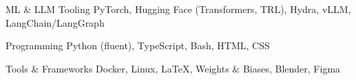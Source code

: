 


\begin{cvskills}

  \cvskill
    {ML \& LLM Tooling}
    {PyTorch, Hugging Face (Transformers, TRL), Hydra, vLLM, LangChain/LangGraph}

  \cvskill
    {Programming}
    {Python (fluent), TypeScript, Bash, HTML, CSS}

  \cvskill
    {Tools \& Frameworks}
    {Docker, Linux, \LaTeX, Weights \& Biases, Blender, Figma}

\end{cvskills}




